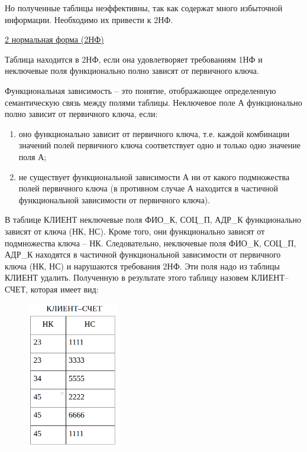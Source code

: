 \begin{enumerate}
    Но полученные таблицы неэффективны, так как содержат много избыточной информации. Необходимо их привести к 2НФ.

    \underline{2 нормальная форма (2НФ)}

    Таблица находится в 2НФ, если она удовлетворяет требованиям 1НФ и неключевые поля функционально полно
    зависят от первичного ключа.

    Функциональная зависимость – это понятие, отображающее определенную семантическую связь между полями таблицы.
    Неключевое поле А функционально полно зависит от первичного ключа, если:
    \begin{enumerate}
        \item оно функционально зависит от первичного ключа, т.е. каждой комбинации значений полей первичного
        ключа соответствует одно и только одно значение поля А;

        \item не существует функциональной зависимости А ни от какого подмножества полей первичного ключа
        (в противном случае А находится в частичной функциональной зависимости от первичного ключа).
    \end{enumerate}

    В таблице КЛИЕНТ неключевые поля ФИО\_К, СОЦ\_П, АДР\_К функционально зависят от ключа (НК, НС). Кроме того,
    они функционально зависят от подмножества ключа – НК. Следовательно, неключевые поля ФИО\_К, СОЦ\_П, АДР\_К
    находятся в частичной функциональной зависимости от первичного ключа (НК, НС) и нарушаются требования 2НФ.
    Эти поля надо из таблицы КЛИЕНТ удалить. Полученную в результате этого таблицу назовем КЛИЕНТ–СЧЕТ, которая
    имеет вид:

    \begin{figure}[H]
        \centering
        \includegraphics[width=40mm]{assets/security/pic20.png}
        \label{fig:mesh22}
    \end{figure}


\end{enumerate}
